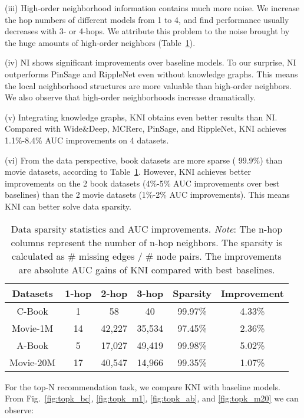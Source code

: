 \documentclass[sigconf]{acmart}
\newcommand{\new}[1]{{\color{black} #1}}
\begin{document}
(iii) High-order neighborhood information contains much more noise. 
We increase the hop numbers of different models from 1 to 4, and find performance usually decreases with 3- or 4-hops.
We attribute this problem to the noise brought by the huge amounts of high-order neighbors (Table~\ref{tab:sp}). 

(iv) NI shows significant improvements over baseline models. To our surprise, NI outperforms PinSage and RippleNet even without knowledge graphs. \new{This means the local neighborhood structures are more valuable than high-order neighbors. We also observe that high-order neighborhoods increase dramatically.}

(v) Integrating knowledge graphs, KNI obtains even better results than NI. \new{Compared with Wide\&Deep, MCRerc, PinSage, and RippleNet, KNI achieves 1.1\%-8.4\% AUC improvements on 4 datasets.} 

(vi) \new{From the data perspective, book datasets are more sparse ( 99.9\%) than movie datasets, according to Table~\ref{tab:sp}. However, KNI achieves better improvements on the 2 book datasets (4\%-5\% AUC improvements over best baselines) than the 2 movie datasets (1\%-2\% AUC improvements). This means KNI can better solve data sparsity.}

\begin{table}
    \centering
    \caption{Data sparsity statistics and AUC improvements. \emph{Note}: The n-hop columns represent the number of n-hop neighbors. The sparsity is calculated as \# missing edges / \# node pairs. The improvements are absolute AUC gains of KNI compared with best baselines.} \label{tab:sp}
    \small
    \begin{tabular}{c|ccc|cc} \hline
    Datasets& 1-hop & 2-hop & 3-hop & Sparsity & Improvement \\ \hline\hline
    C-Book & 1 & 58 & 40 & 99.97\% & 4.33\% \\
    Movie-1M & 14 & 42,227 & 35,534 & 97.45\% & 2.36\% \\
    A-Book & 5 & 17,027 & 49,419 & 99.98\% & 5.02\%\\
    Movie-20M & 17 & 40,547 & 14,966 & 99.35\% & 1.07\% \\ \hline
    \end{tabular}
\end{table}

For the top-N recommendation task, we compare KNI with baseline models.
From Fig.~\ref{fig:topk_bc}, \ref{fig:topk_m1}, \ref{fig:topk_ab}, and \ref{fig:topk_m20} we can observe:
\end{document}
